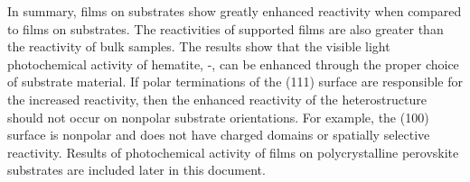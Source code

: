 In summary,  films on  substrates show greatly enhanced reactivity when compared to films on  substrates. The reactivities of  supported films are also greater than the reactivity of bulk  samples.  The results show that the visible light photochemical activity of hematite, \textalpha-, can be enhanced through the proper choice of substrate material. If polar terminations of the (111) surface are responsible for the increased reactivity, then the enhanced reactivity of the heterostructure should not occur on nonpolar substrate orientations.  For example, the (100) surface is nonpolar and does not have charged domains or spatially selective reactivity.\cite{Giocondi:2003wc} Results of photochemical activity of  films on polycrystalline perovskite substrates are included later in this document.